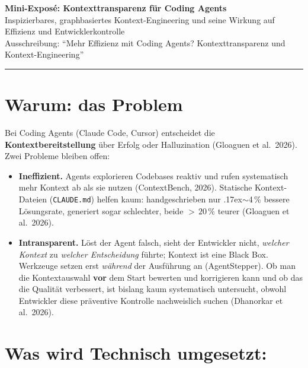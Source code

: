 \documentclass[11pt,a4paper]{scrartcl}
\newcommand{\code}[1]{\texttt{#1}}
\begin{document}
\begin{center}
  {\Large\bfseries Mini-Exposé: Kontexttransparenz für Coding Agents}\\[0.3em]
  {\small Inspizierbares, graphbasiertes Kontext-Engineering und seine Wirkung auf
  Effizienz und Entwicklerkontrolle \\
  Ausschreibung: \enquote{Mehr Effizienz mit Coding Agents? Kontexttransparenz und
  Kontext-Engineering}}
\end{center}

\vspace{0.2em}
\hrule
\vspace{0.4em}

\section{Warum: das Problem}

Bei Coding Agents (Claude Code, Cursor) entscheidet die \textbf{Kontextbereitstellung} über
Erfolg oder Halluzination (Gloaguen et al.\ 2026). Zwei Probleme bleiben offen:

\begin{itemize}
  \item \textbf{Ineffizient.} Agents explorieren Codebases reaktiv und rufen systematisch mehr
    Kontext ab als sie nutzen (ContextBench, 2026). Statische Kontext-Dateien (\code{CLAUDE.md})
    helfen kaum: handgeschrieben nur {\raise.17ex\hbox{$\scriptstyle\sim$}}4\,\% bessere
    Lösungsrate, generiert sogar schlechter, beide ${>}\,20\,\%$ teurer (Gloaguen et al.\ 2026).
  \item \textbf{Intransparent.} Löst der Agent falsch, sieht der Entwickler nicht, \emph{welcher
    Kontext} zu \emph{welcher Entscheidung} führte; Kontext ist eine Black Box. Werkzeuge
    setzen erst \emph{während} der Ausführung an (AgentStepper). Ob man die Kontextauswahl
    \textbf{vor} dem Start bewerten und korrigieren kann und ob das die Qualität verbessert,
    ist bislang kaum systematisch untersucht, obwohl Entwickler diese präventive Kontrolle
    nachweislich suchen (Dhanorkar et al.\ 2026).
\end{itemize}

\section{Was wird Technisch umgesetzt:}
\end{document}
